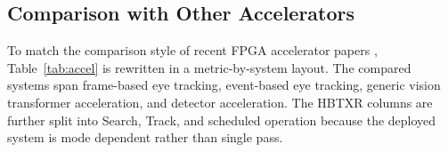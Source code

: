 \documentclass[journal]{IEEEtran}
\begin{document}
\subsection{Comparison with Other Accelerators}
To match the comparison style of recent FPGA accelerator papers \cite{ref8,ref9,ref10,ref11,ref12}, Table~\ref{tab:accel} is rewritten in a metric-by-system layout. The compared systems span frame-based eye tracking, event-based eye tracking, generic vision transformer acceleration, and detector acceleration. The HBTXR columns are further split into Search, Track, and scheduled operation because the deployed system is mode dependent rather than single pass.

\begin{table}[t]
\caption{Deployment-Oriented Comparison with Representative Accelerators Using Source-Reported Metrics}
\label{tab:accel}
\centering
\scriptsize
{}
\end{table}
\end{document}

